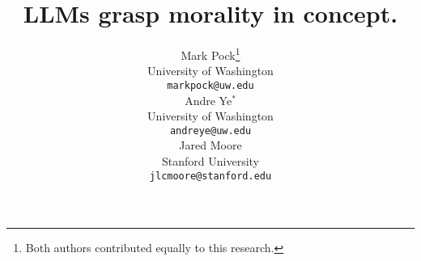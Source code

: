 \documentclass{article}
\title{LLMs grasp morality in concept.}
\author{%
  Mark Pock\thanks{Both authors contributed equally to this research.} \\
  University of Washington\\
  \texttt{markpock@uw.edu} \\
  \And
  Andre Ye$^*$ \\
  University of Washington \\
  \texttt{andreye@uw.edu} \\
  \And
  Jared Moore\\
  Stanford University\\
  \texttt{jlcmoore@stanford.edu}\\
}
\begin{document}
\newcommand{\jared}[1]{\textcolor{blue}{[jared: #1]}}
\newcommand{\andre}[1]{\textcolor{red}{[andre: #1]}}
\newcommand{\markC}[1]{\textcolor{purple}{[mark: #1]}}


\maketitle




\begin{abstract}
  
\end{abstract}

\maketitle







 



\end{document}
